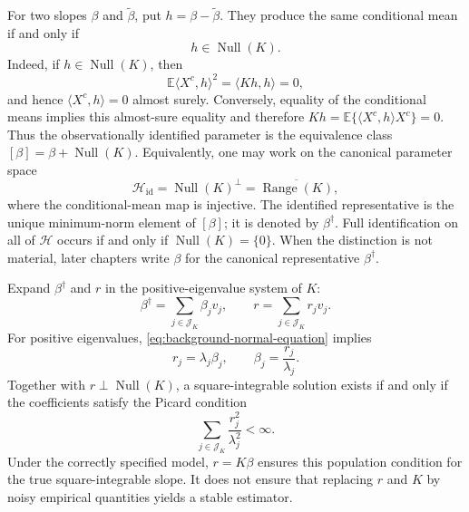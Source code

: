 For two slopes $\beta$ and $\widetilde\beta$, put
$h=\beta-\widetilde\beta$.  They produce the same conditional mean if and only
if
\begin{equation}
    h\in\operatorname{Null}(K).
    \label{eq:identified-equivalence}
\end{equation}
Indeed, if $h\in\operatorname{Null}(K)$, then
\begin{equation}
    \mathbb E\langle X^c,h\rangle^2=\langle Kh,h\rangle=0,
\end{equation}
and hence $\langle X^c,h\rangle=0$ almost surely.  Conversely, equality of
the conditional means implies this almost-sure equality and therefore
$Kh=\mathbb E\{\langle X^c,h\rangle X^c\}=0$.  Thus the observationally
identified parameter is the equivalence class
$[\beta]=\beta+\operatorname{Null}(K)$.  Equivalently, one may work on the
canonical parameter space
\begin{equation}
    \mathcal H_{\mathrm{id}}=\operatorname{Null}(K)^\perp
    =\overline{\operatorname{Range}(K)},
    \label{eq:identified-parameter-space}
\end{equation}
where the conditional-mean map is injective.  The identified representative is
the unique minimum-norm element of $[\beta]$; it is denoted by
$\beta^\dagger$.  Full identification on all of $\mathcal H$ occurs if and only
if $\operatorname{Null}(K)=\{0\}$.  When the distinction is not material, later
chapters write $\beta$ for the canonical representative $\beta^\dagger$.

Expand $\beta^\dagger$ and $r$ in the positive-eigenvalue system of $K$:
\begin{equation}
    \beta^\dagger=\sum_{j\in\mathcal J_K}\beta_jv_j,
    \qquad
    r=\sum_{j\in\mathcal J_K}r_jv_j.
    \label{eq:beta-r-spectral-expansions}
\end{equation}
For positive eigenvalues, \eqref{eq:background-normal-equation} implies
\begin{equation}
    r_j=\lambda_j\beta_j,
    \qquad
    \beta_j=\frac{r_j}{\lambda_j}.
    \label{eq:spectral-inverse-coefficients}
\end{equation}
Together with $r\perp\operatorname{Null}(K)$, a square-integrable solution
exists if and only if the coefficients satisfy the Picard condition
\begin{equation}
    \sum_{j\in\mathcal J_K}\frac{r_j^2}{\lambda_j^2}<\infty.
    \label{eq:picard-condition}
\end{equation}
Under the correctly specified model, $r=K\beta$ ensures this population condition for the true square-integrable slope. It does not ensure that replacing $r$ and $K$ by noisy empirical quantities yields a stable estimator.

